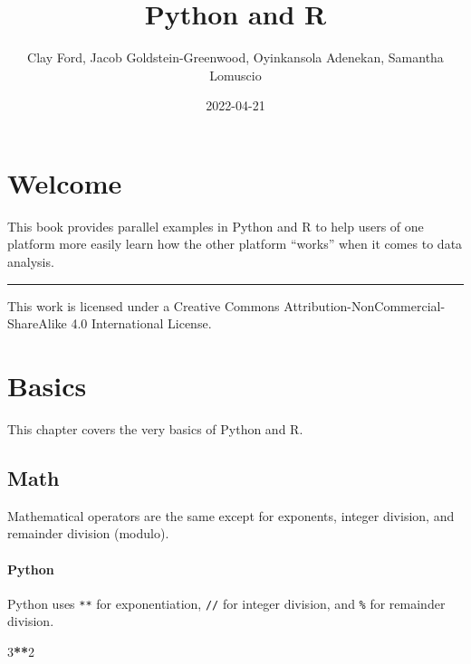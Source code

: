 \documentclass[
]{book}
\title{Python and R}
\author{Clay Ford, Jacob Goldstein-Greenwood, Oyinkansola Adenekan, Samantha Lomuscio}
\date{2022-04-21}
\newenvironment{Shaded}{\begin{snugshade}}{\end{snugshade}}
\newcommand{\DecValTok}[1]{\textcolor[rgb]{0.00,0.00,0.81}{#1}}
\newcommand{\OperatorTok}[1]{\textcolor[rgb]{0.81,0.36,0.00}{\textbf{#1}}}
\begin{document}
\maketitle

{
\setcounter{tocdepth}{1}
\tableofcontents
}
\hypertarget{welcome}{%
\chapter*{Welcome}\label{welcome}}

This book provides parallel examples in Python and R to help users of one platform more easily learn how the other platform ``works'' when it comes to data analysis.

\begin{center}\rule{0.5\linewidth}{0.5pt}\end{center}

This work is licensed under a Creative Commons Attribution-NonCommercial-ShareAlike 4.0 International License.

\hypertarget{basics}{%
\chapter{Basics}\label{basics}}

This chapter covers the very basics of Python and R.

\hypertarget{math}{%
\section{Math}\label{math}}

Mathematical operators are the same except for exponents, integer division, and remainder division (modulo).

\hypertarget{python}{%
\subsubsection*{Python}\label{python}}

Python uses \texttt{**} for exponentiation, \texttt{//} for integer division, and \texttt{\%} for remainder division.

\begin{Shaded}
\begin{Highlighting}[]
\DecValTok{3}\OperatorTok{**}\DecValTok{2}
\end{Highlighting}
\end{Shaded}
\end{document}

